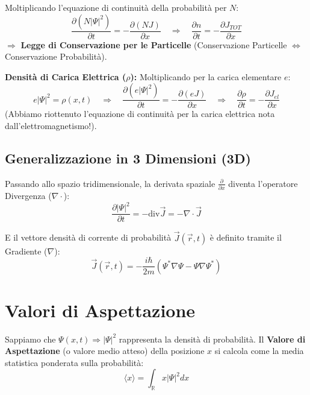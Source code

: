 \documentclass[11pt, a4paper]{article}
\begin{document}
Moltiplicando l'equazione di continuità della probabilità per $N$: %
\begin{equation*}
    \frac{\partial (N|\Psi|^2)}{\partial t} = -\frac{\partial (NJ)}{\partial x} \quad \Rightarrow \quad \frac{\partial n}{\partial t} = -\frac{\partial J_{TOT}}{\partial x} %
\end{equation*}
$\Rightarrow$ \textbf{Legge di Conservazione per le Particelle} (Conservazione Particelle $\Leftrightarrow$ Conservazione Probabilità). %

\noindent
\textbf{Densità di Carica Elettrica ($\rho$):} %
Moltiplicando per la carica elementare $e$: %
\begin{equation*}
    e|\Psi|^2 = \rho(x,t) \quad \Rightarrow \quad \frac{\partial (e|\Psi|^2)}{\partial t} = -\frac{\partial (eJ)}{\partial x} \quad \Rightarrow \quad \frac{\partial \rho}{\partial t} = -\frac{\partial J_{el}}{\partial x} %
\end{equation*}
(Abbiamo riottenuto l'equazione di continuità per la carica elettrica nota dall'elettromagnetismo!). %

\subsection{Generalizzazione in 3 Dimensioni (3D)} %

Passando allo spazio tridimensionale, la derivata spaziale $\frac{\partial}{\partial x}$ diventa l'operatore Divergenza ($\nabla \cdot$): %
\begin{equation}
    \frac{\partial |\Psi|^2}{\partial t} = -\text{div}\vec{J} = -\nabla \cdot \vec{J} %
\end{equation}

E il vettore densità di corrente di probabilità $\vec{J}(\vec{r},t)$ è definito tramite il Gradiente ($\nabla$): %
\begin{equation}
    \boxed{ \vec{J}(\vec{r},t) = -\frac{i\hbar}{2m} (\Psi^* \nabla \Psi - \Psi \nabla \Psi^*) } %
\end{equation}

\section{Valori di Aspettazione} %

Sappiamo che $\Psi(x,t) \Rightarrow |\Psi|^2$ rappresenta la densità di probabilità. %
Il \textbf{Valore di Aspettazione} (o valore medio atteso) della posizione $x$ si calcola come la media statistica ponderata sulla probabilità: %
\begin{equation}
    \langle x \rangle = \int_{\mathbb{R}} x |\Psi|^2 dx %
\end{equation}
\end{document}
